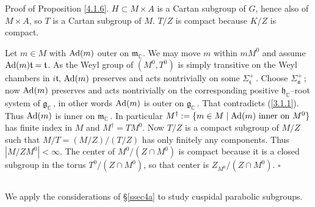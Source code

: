 \documentclass{conm-p-l}
\renewcommand{\gg}{\mathfrak{g}}
\def\ga{\mathfrak{a}}
\def\gg{\mathfrak{g}}
\def\gh{\mathfrak{h}}
\def\gm{\mathfrak{m}}
\def\gt{\mathfrak{t}}
\def\Ad{{\rm Ad}}
\def\C{\mathbb{C}}
\begin{document}
{\sc Proof of Proposition \ref{4.1.6}.}  $H \subset M \times A$ is a Cartan
subgroup of $G$, hence also of $M\times A$, so $T$ is a Cartan subgroup
of $M$.  $T/Z$ is compact because $K/Z$ is compact.

Let $m \in M$ with $\Ad(m)$ outer on $\gm_\C$.  We may move $m$ within
$mM^0$ and assume $\Ad(m)\gt = \gt$. As the Weyl group of $(M^0,T^0)$ is
simply transitive on the Weyl chambers in $i\gt$, $\Ad(m)$ preserves and
acts nontrivially on some $\Sigma_\gt^+$\,.  Choose $\Sigma_\ga^+$\,; now
$\Ad(m)$ preserves and acts nontrivially on the corresponding positive
$\gh_\C$--root system of $\gg_\C$\,, in other words $\Ad(m)$ is outer on
$\gg_\C$\,.  That contradicts (\ref{3.1.1}).  Thus $\Ad(m)$ is inner on
$\gm_\C$\,.  In particular $M^\dagger := \{m \in M \mid \Ad(m) \text{ inner
on } M^0\}$ has finite index in $M$ and $M^\dagger = TM^0$.
Now $T/Z$ is a compact subgroup of $M/Z$ such that $M/T = (M/Z)/(T/Z)$ has
only finitely any components.  Thus $|M/ZM^0| < \infty$.  The center of
$M^0/(Z\cap M^0)$ is compact because it is a closed subgroup in the  torus
$T^0/(Z\cap M^0)$, so that center is $Z_{M^0}/(Z\cap M^0)$.
\hfill $\square$

\subsection{}\label{ssec4b}\setcounter{equation}{0}
We apply the considerations of \S\ref{ssec4a} to study cuspidal parabolic
subgroups.  
\end{document}
